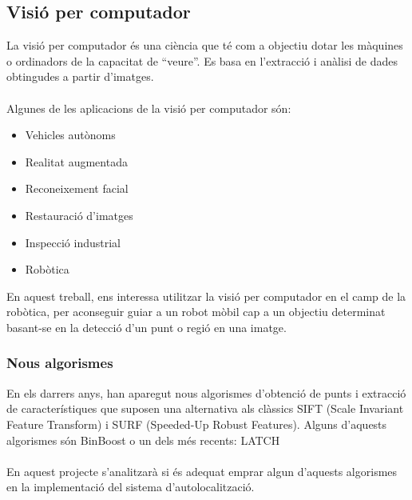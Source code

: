 	\subsection{Visió per computador}
		La visió per computador\cite{Szeliski} és una ciència que té com a objectiu dotar les màquines o ordinadors de la capacitat de ``veure''.
		Es basa en l'extracció i anàlisi de dades obtingudes a partir d'imatges.\\\\
		Algunes de les aplicacions de la visió per computador són:\\
		\begin{itemize}
			\item Vehicles autònoms
			\item Realitat augmentada
			\item Reconeixement facial
			\item Restauració d'imatges
			\item Inspecció industrial 
			\item Robòtica\\
		\end{itemize}
		En aquest treball, ens interessa utilitzar la visió per computador en el camp de la robòtica, per aconseguir guiar a un robot mòbil cap a un objectiu
		determinat basant-se en la detecció d'un punt o regió en una imatge.
		\subsubsection{Nous algorismes}
			En els darrers anys, han aparegut nous algorismes d'obtenció de punts i extracció de característiques que suposen una alternativa als clàssics SIFT\cite{SIFT}
			(Scale Invariant Feature Transform) i SURF\cite{SURF} (Speeded-Up Robust Features). Alguns d'aquests algorismes són BinBoost\cite{Trzcinski13a} o un dels més recents:
			LATCH\cite{LeviHassner2016LATCH}\\\\
			En aquest projecte s'analitzarà si és adequat emprar algun d'aquests algorismes en la implementació del sistema d'autolocalització. 
\newpage
